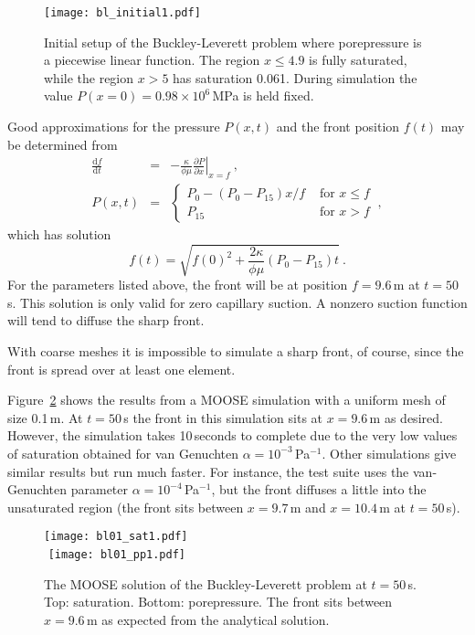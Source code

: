 \documentclass[]{report}
\begin{document}
\begin{figure}[htb]
\begin{center}
\texttt{[image: bl\_initial1.pdf]}
\caption{Initial setup of the Buckley-Leverett problem where
  porepressure is a piecewise linear function.  The region
$x\leq 4.9$ is fully saturated, while the region $x>5$ has saturation
  0.061.  During simulation the value $P(x=0)=0.98\times 10^{6}$\,MPa
  is held fixed.}
\label{bl_setup.figa}
\end{center}
\end{figure}

Good approximations for the pressure $P(x,t)$
and the front position $f(t)$ may be determined from
\begin{eqnarray}
\frac{{\mathrm d} f}{{\mathrm d} t} & = & -\frac{\kappa}{\phi\mu}
\left.\frac{\partial  P}{\partial x}\right|_{x = f} \ , \nonumber \\
P(x,t) & = & \left\{
\begin{array}{ll}
P_{0} - (P_{0}-P_{15})x/f & \mbox{ for } x\leq f  \\
P_{15} & \mbox{ for } x>f
\end{array}
\right. \ ,
\label{eqn.predicted.bl.posn.eqna}
\end{eqnarray}
which has solution
\begin{equation}
f(t) = \sqrt{f(0)^{2} + \frac{2\kappa}{\phi\mu}(P_{0}-P_{15})t} \ .
\end{equation}
For the parameters listed above, the front will be at position
$f=9.6$\,m at $t=50$\,s.  This solution is only valid for zero
capillary suction.  A nonzero suction function will tend to diffuse
the sharp front.

With coarse meshes it is impossible to simulate a sharp front, of
course, since the front is spread over at least one element.

Figure~\ref{satfront.figa} shows the results from a MOOSE simulation
with a uniform mesh of size 0.1\,m.  At $t=50$\,s the front in this
simulation sits at $x=9.6$\,m as desired.  However, the simulation
takes 10\,seconds to complete due to the very low values of saturation
obtained for van Genuchten $\alpha=10^{-3}$\,Pa$^{-1}$.  Other
simulations give similar results but run much faster.  For instance,
the test suite uses the van-Genuchten parameter
$\alpha=10^{-4}$\,Pa$^{-1}$, but the front diffuses a little into the
unsaturated region (the front sits between $x=9.7$\,m and $x=10.4$\,m
at $t=50$\,s).

\begin{figure}[htb]
\begin{center}
\texttt{[image: bl01\_sat1.pdf]} \\
$\mbox{}$
\texttt{[image: bl01\_pp1.pdf]} \\
\caption{The MOOSE solution of the Buckley-Leverett problem at
  $t=50$\,s.  Top: saturation.  Bottom: porepressure.  The front sits
  between $x=9.6$\,m as expected from the analytical solution.}
\label{satfront.figa}
\end{center}
\end{figure}
\end{document}
